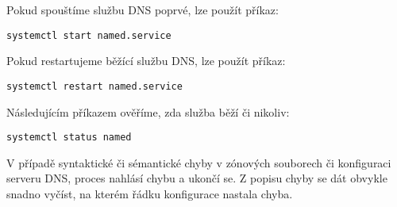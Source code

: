 Pokud spouštíme službu DNS poprvé, lze použít příkaz:
\begin{verbatim}
systemctl start named.service
\end{verbatim}

Pokud restartujeme běžící službu DNS, lze použít  příkaz: 
\begin{verbatim}
systemctl restart named.service
\end{verbatim}

Následujícím příkazem ověříme, zda služba běží či nikoliv:
\begin{verbatim}
systemctl status named
\end{verbatim}

V případě syntaktické či sémantické chyby v zónových souborech či konfiguraci serveru DNS, proces nahlásí chybu a ukončí se. Z popisu chyby se dát obvykle snadno vyčíst, na kterém řádku konfigurace nastala chyba. 

